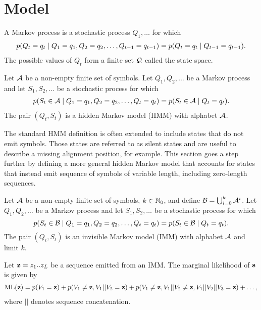 \section{Model}

\begin{definition}\label{def:mp}
  A Markov process is a stochastic process $Q_1, \dots$ for which
  \begin{align*}
    p(Q_t=q_t \;|\; Q_1=q_1, Q_2=q_2, \dots, Q_{t-1}=q_{t-1}) = p(Q_t=q_t \;|\; Q_{t-1}=q_{t-1}).
  \end{align*}
  The possible values of $Q_t$ form a finite set $\mathcal{Q}$ called the state space.
\end{definition}

\begin{definition}\label{def:hmm}
  Let $\mathcal{A}$ be a non-empty finite set of symbols. Let $Q_1, Q_2, \dots$ be a Markov process and
  let $S_1, S_2, \dots$ be a stochastic process for which
  \begin{align*}
    p(S_t\in\mathcal{A} \;|\; Q_1=q_1, Q_2=q_2, \dots, Q_t=q_t) = p(S_t\in\mathcal{A} \;|\; Q_t=q_t).
  \end{align*}
  The pair $(Q_t, S_t)$ is a hidden Markov model (HMM) with alphabet $\mathcal{A}$.
\end{definition}

The standard HMM definition is often extended to include states that do not emit symbols. Those
states are referred to as silent states and are useful to describe a missing alignment position, for
example. This section goes a step further by defining a more general hidden Markov model that
accounts for states that instead emit sequence of symbols of variable length, including zero-length
sequences.

\begin{definition}
  Let $\mathcal{A}$ be a non-empty finite set of symbols, $k\in\mathbb{N}_0$, and define
  $\mathcal{B}=\bigcup_{i=0}^k\mathcal{A}^i$.
  Let $Q_1, Q_2, \dots$ be a Markov process and let $S_1, S_2, \dots$ be a stochastic process for
  which
  \begin{equation*}
    p(S_t\in\mathcal{B} \;|\; Q_1=q_1, Q_2=q_2, \dots, Q_t=q_t)
    = p(S_t\in\mathcal{B} \;|\; Q_t=q_t).
  \end{equation*}
  The pair $(Q_t, S_t)$ is an invisible Markov model (IMM) with alphabet $\mathcal{A}$ and
  limit $k$.
\end{definition}

Let $\mathbf{z}=z_1 .. z_L$ be a sequence emitted from an IMM.
The marginal likelihood of $\mathbf{s}$ is given by
\begin{align}\label{eq:ml}
  \mathrm{ML}(\mathbf{z}) = p(V_1=\mathbf{z}) + p(V_1\neq\mathbf{z}, V_1||V_2=\mathbf{z}) +
  p(V_1\neq\mathbf{z}, V_1||V_2\neq\mathbf{z}, V_1||V_2||V_3=\mathbf{z}) + \dots,
\end{align}
where $||$ denotes sequence concatenation.

